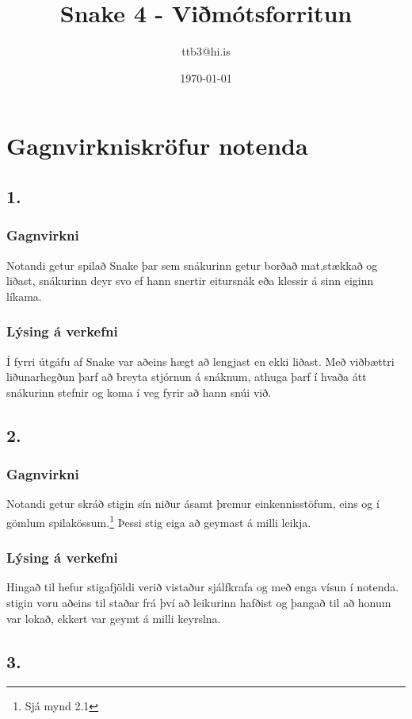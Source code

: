 \documentclass{article}
\title{Snake 4 - Viðmótsforritun}
\author{ttb3@hi.is}
\date{\today}
\begin{document}
\maketitle


\section*{Gagnvirkniskröfur notenda}
\subsection*{1.}
\subsubsection*{Gagnvirkni}
    Notandi getur spilað Snake þar sem snákurinn getur borðað mat,stækkað og liðast, 
    snákurinn deyr svo ef hann snertir eitursnák eða klessir á sinn eiginn líkama.
\subsubsection*{Lýsing á verkefni} 
    Í fyrri útgáfu af Snake var aðeins hægt að lengjast en ekki liðast. 
    Með viðbættri liðunarhegðun þarf að breyta stjórnun á snáknum, 
    athuga þarf í hvaða átt snákurinn stefnir og koma í veg fyrir að hann snúi við.

\subsection*{2.}
\subsubsection*{Gagnvirkni}
Notandi getur skráð stigin sín niður ásamt þremur einkennisstöfum,
eins og í gömlum spilakössum.\footnote{Sjá mynd 2.1} Þessi stig eiga að geymast á milli leikja.

\subsubsection*{Lýsing á verkefni}
Hingað til hefur stigafjöldi verið vistaður sjálfkrafa og með enga vísun í notenda.
stigin voru aðeins til staðar frá því að leikurinn hafðist og þangað til að honum var lokað,
ekkert var geymt á milli keyrslna.

\subsection*{3.}
\end{document}
